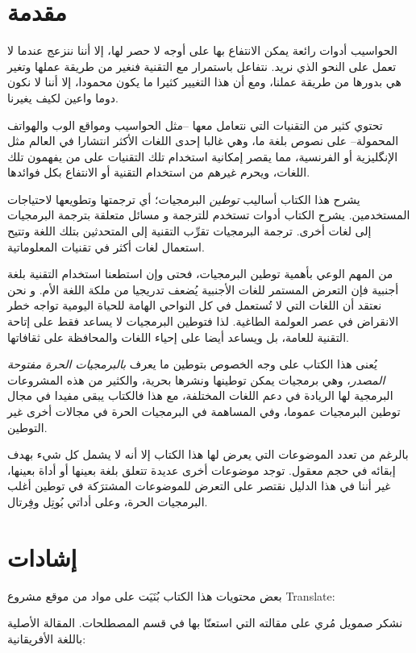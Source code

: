 \section{مقدمة}
الحواسيب أدوات رائعة يمكن الانتفاع بها على أوجه لا حصر لها، إلا أننا
ننزعج عندما لا تعمل على النحو الذي نريد. نتفاعل باستمرار مع التقنية
فنغير من طريقة عملها وتغير هي بدورها من طريقة عملنا، ومع أن هذا التغيير
كثيرا ما يكون محمودا، إلا أننا لا نكون دوما واعين لكيف يغيرنا.

تحتوي كثير من التقنيات التي نتعامل معها –مثل الحواسيب ومواقع الوب
والهواتف المحمولة– على نصوص بلغة ما، وهي غالبا إحدى اللغات الأكثر
انتشارا في العالم مثل الإنگليزية أو الفرنسية، مما يقصر إمكانية استخدام
تلك التقنيات على من يفهمون تلك اللغات، ويحرم غيرهم من استخدام التقنية
أو الانتفاع بكل فوائدها.

يشرح هذا الكتاب أساليب {\it توطين} البرمجيات؛ أي ترجمتها وتطويعها
لاحتياجات المستخدمين. يشرح الكتاب أدوات تستخدم للترجمة و مسائل متعلقة
بترجمة البرمجيات إلى لغات أخرى. ترجمة البرمجيات تقرِّب التقنية إلى
المتحدثين بتلك اللغة وتتيح استعمال لغات أكثر في تقنيات المعلوماتية.

من المهم الوعي بأهمية توطين البرمجيات، فحتى وإن استطعنا استخدام التقنية
بلغة أجنبية فإن التعرض المستمر للغات الأجنبية يُضعف تدريجيا من ملكة
اللغة الأم. و نحن نعتقد أن اللغات التي لا تُستعمل في كل النواحي الهامة
للحياة اليومية تواجه خطر الانقراض في عصر العولمة الطاغية. لذا فتوطين
البرمجيات لا يساعد فقط على إتاحة التقنية للعامة، بل ويساعد أيضا على
إحياء اللغات والمحافظة على ثقافاتها.

يُعنى هذا الكتاب على وجه الخصوص بتوطين ما يعرف {\it بالبرمجيات الحرة
مفتوحة المصدر}، وهي برمجيات يمكن توطينها ونشرها بحرية، والكثير من هذه
المشروعات البرمجية لها الريادة في دعم اللغات المختلفة، مع هذا فالكتاب
يبقى مفيدا في مجال توطين البرمجيات عموما، وفي المساهمة في البرمجيات
الحرة في مجالات أخرى غير التوطين.

بالرغم من تعدد الموضوعات التي يعرض لها هذا الكتاب إلا أنه لا يشمل كل شيء
بهدف إبقائه في حجم معقول. توجد موضوعات أخرى عديدة تتعلق بلغة بعينها أو
أداة بعينها، غير أننا في هذا الدليل نقتصر على التعرض للموضوعات
المشترَكة في توطين أغلب البرمجيات الحرة، وعلى أداتي بُوتِل وفِرتال.

\section{إشادات}
بعض محتويات هذا الكتاب بُنَيَت على مواد من موقع مشروع Translate:


نشكر صمويل مُري على مقالته التي استعنّا بها في قسم المصطلحات. المقالة
الأصلية باللغة الأفريقانية:

